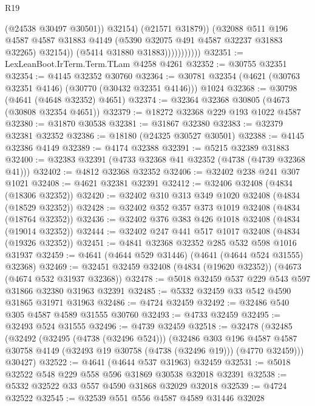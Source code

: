 \begin{lexlean}{R19}
\begin{coremodule}
                                (@24538 @30497 @30501))
                              @32154)
                            (@21571 @31879))
                          (@32088
                            @511
                            @196
                            @4587
                            @4587
                            @31883
                            @4149
                            (@5390 @32075 @491 @4587 @32237 @31883 @32265)
                            @32154))
                        (@5414 @31880 @31883)))))))))))
@32351 := LexLeanBoot.IrTerm.Term.TLam @4258 @4261
@32352 := @30755 @32351
@32354 := @4145 @32352 @30760
@32364 := @30781 @32354 (@4621 (@30763 @32351 @4146) (@30770 (@30432 @32351 @4146))) @1024
@32368 := @30798 (@4641 (@4648 @32352) @4651)
@32374 := @32364 @32368 @30805 (@4673 (@30808 @32354 @4651))
@32379 := @18272 @32368 @229 @193 @1022 @4587
@32380 := @31870 @30538
@32381 := @31867 @32380
@32383 := @32379 @32381 @32352
@32386 := @18180 (@24325 @30527 @30501)
@32388 := @4145 @32386 @4149
@32389 := @4174 @32388
@32391 := @5215 @32389 @31883
@32400 := @32383 @32391 (@4733 @32368 @41 @32352 (@4738 (@4739 @32368 @41)))
@32402 := @4812 @32368 @32352
@32406 := @32402 @238 @241 @307 @1021
@32408 := @4621 @32381 @32391
@32412 := @32406 @32408 (@4834 (@18306 @32352))
@32420 := @32402 @310 @313 @349 @1020 @32408 (@4834 (@18529 @32352))
@32428 := @32402 @352 @357 @373 @1019 @32408 (@4834 (@18764 @32352))
@32436 := @32402 @376 @383 @426 @1018 @32408 (@4834 (@19014 @32352))
@32444 := @32402 @247 @441 @517 @1017 @32408 (@4834 (@19326 @32352))
@32451 := @4841 @32368 @32352 @285 @532 @598 @1016 @31937
@32459 := @4641 (@4644 @529 @31446) (@4641 (@4644 @524 @31555) @32368)
@32469 := @32451 @32459 @32408 (@4834 (@19620 @32352)) (@4673 (@4674 @532 @31937 @32368))
@32478 := @5018 @32459 @537 @229 @543 @597 @31866 @32380 @31963 @32391
@32485 := @5332 @32459 @33 @542 @4590 @31865 @31971 @31963
@32486 := @4724 @32459
@32492 := @32486 @540 @305 @4587 @4589 @31555 @30760
@32493 := @4733 @32459
@32495 := @32493 @524 @31555
@32496 := @4739 @32459
@32518 := @32478
    (@32485
      (@32492
        (@32495 (@4738 (@32496 @524)))
        (@32486
          @303
          @196
          @4587
          @4587
          @30758
          @4149
          (@32493 @19 @30758 (@4738 (@32496 @19)))
          (@4770 @32459)))
      @30427)
@32522 := @4641 (@4644 @537 @31963) @32459
@32531 := @5018 @32522 @548 @229 @558 @596 @31869 @30538 @32018 @32391
@32538 := @5332 @32522 @33 @557 @4590 @31868 @32029 @32018
@32539 := @4724 @32522
@32545 := @32539 @551 @556 @4587 @4589 @31446 @32028

\end{coremodule}
\end{lexlean}
